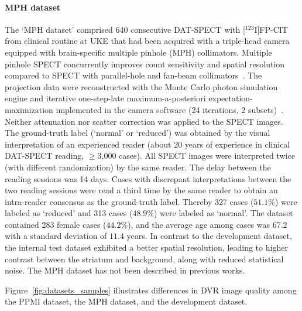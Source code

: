 \paragraph{MPH dataset}
The `MPH dataset' comprised 640 consecutive DAT-SPECT with [$^{123}$I]FP-CIT from clinical routine at UKE 
that had been acquired with a triple-head camera equipped with brain-specific multiple pinhole (MPH) collimators. 
Multiple pinhole SPECT concurrently improves count sensitivity and spatial resolution compared to SPECT with parallel-hole 
and fan-beam collimators~\citep{Mathies2022-yi, Tecklenburg2020-xr}.
The projection data were reconstructed with the Monte Carlo photon simulation engine 
and iterative one-step-late maximum-a-posteriori expectation-maximization implemented 
in the camera software (24 iterations, 2 subsets)~\citep{Tecklenburg2020-xr, Magdics2010}.
Neither attenuation nor scatter correction was applied to the SPECT images.
The ground-truth label (`normal' or `reduced') was obtained by the visual interpretation of an experienced reader 
(about 20 years of experience in clinical DAT-SPECT reading, $\geq$3,000 cases).
All SPECT images were interpreted twice (with different randomization) by the same reader. 
The delay between the reading sessions was 14 days. 
Cases with discrepant interpretations between the two reading sessions were read a third time by the same reader 
to obtain an intra-reader consensus as the ground-truth label. 
Thereby 327 cases ($51.1\%$) were labeled as `reduced'  and 313 cases ($48.9\%$) were labeled as `normal'.
The dataset contained 283 female cases ($44.2\%$),
and the average age among cases was $67.2$ with a standard deviation of $11.4$ years.
In contrast to the development dataset, the internal test dataset exhibited a better spatial resolution, 
leading to higher contrast between the striatum and background, along with reduced statistical noise.
The MPH dataset has not been described in previous works.

Figure~\ref{fig:datasets_samples} illustrates differences in DVR image quality
among the PPMI dataset, the MPH dataset, and the development dataset.

